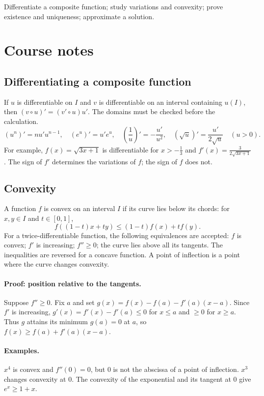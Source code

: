\label{ch:4}


\begin{keypoint}[Objectives]Differentiate a composite function; study variations and convexity; prove existence and uniqueness; approximate a solution.\end{keypoint}

\section{Course notes}
\subsection{Differentiating a composite function}
If $u$ is differentiable on $I$ and $v$ is differentiable on an interval containing $u(I)$, then $(v\circ u)'=(v'\circ u)u'$. The domains must be checked before the calculation.
\[ (u^n)'=nu'u^{n-1},\quad(e^u)'=u'e^u,\quad
(\frac{1}{u})'=-\frac{u'}{u^2},\quad(\sqrt u)'=\frac{u'}{2\sqrt u}\quad(u>0).\]
For example, $f(x)=\sqrt{3x+1}$ is differentiable for $x>-\frac{1}{3}$ and $f'(x)=\frac{3}{2\sqrt{3x+1}}$. The sign of $f'$ determines the variations of $f$; the sign of $f$ does not.
\subsection{Convexity}
A function $f$ is convex on an interval $I$ if its curve lies below its chords: for $x,y\in I$ and $t\in[0,1]$,
\[f((1-t)x+ty)\le(1-t)f(x)+tf(y).\]
For a twice-differentiable function, the following equivalences are accepted: $f$ is convex; $f'$ is increasing; $f''\ge0$; the curve lies above all its tangents. The inequalities are reversed for a concave function. A point of inflection is a point where the curve changes convexity.
\paragraph{Proof: position relative to the tangents.} Suppose $f''\ge0$. Fix $a$ and set $g(x)=f(x)-f(a)-f'(a)(x-a)$. Since $f'$ is increasing, $g'(x)=f'(x)-f'(a)\le0$ for $x\le a$ and $\ge0$ for $x\ge a$. Thus $g$ attains its minimum $g(a)=0$ at $a$, so $f(x)\ge f(a)+f'(a)(x-a)$.
\paragraph{Examples.} $x^4$ is convex and $f''(0)=0$, but $0$ is not the abscissa of a point of inflection. $x^3$ changes convexity at $0$. The convexity of the exponential and its tangent at $0$ give $e^x\ge1+x$.
